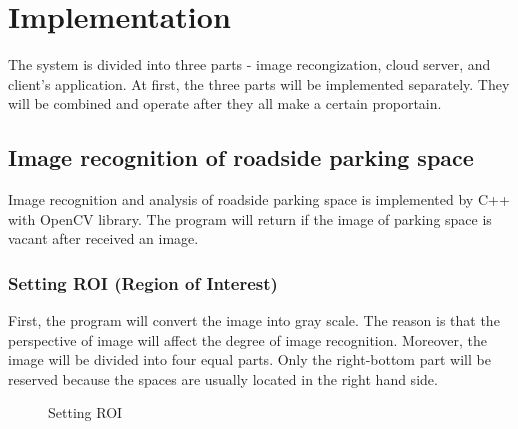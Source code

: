 \documentclass[runningheads,a4paper]{llncs}
\begin{document}
\section{Implementation}\label{sec:implementation}

The system is divided into three parts - image recongization, cloud
server, and client's application. At first, the three parts will be implemented
separately. They will be combined and operate after they all make a certain proportain.

\subsection{Image recognition of roadside parking space}

Image recognition and analysis of roadside parking space is implemented by C++ with
OpenCV library. The program will return if the image of parking space is
vacant after received an image.

\subsubsection{Setting ROI (Region of Interest)}

First, the program will convert the image into gray scale. The reason is
that the perspective of image will affect the degree of image
recognition. Moreover, the image will be divided into four equal parts.
Only the right-bottom part will be reserved because the spaces are
usually located in the right hand side.

\begin{figure}[tbp]
	\hspace{0.2in}
	\caption{Setting ROI}
	\label{fig:ROI}
\end{figure}
\end{document}

